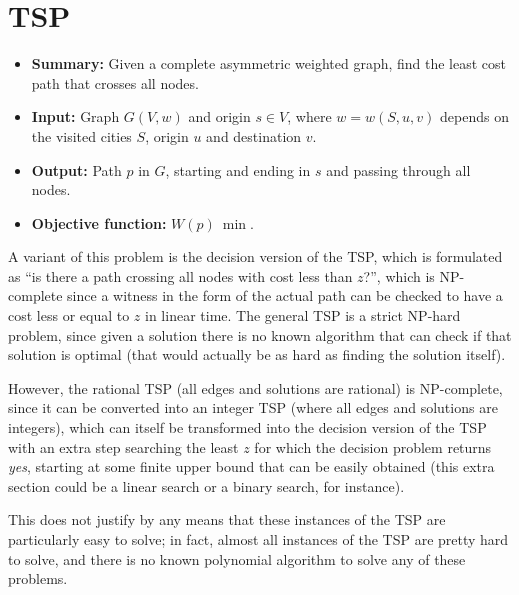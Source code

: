 \section{\texorpdfstring{\Acrlong*{TSP}}{Travelling salesman problem}} \label{algorithm-tsp}
\begin{itemize}
    \item \textbf{Summary:} Given a complete asymmetric weighted graph, find the least cost path that crosses all nodes. 
    \item \textbf{Input:} Graph $G(V,w)$ and origin $s \in V$, where $w=w(S, u, v)$ depends on the visited cities $S$, origin $u$ and destination $v$.
    \item \textbf{Output:} Path $p$ in $G$, starting and ending in $s$ and passing through all nodes.
    \item \textbf{Objective function:} $W(p)~\min$.
\end{itemize}
A variant of this problem is the decision version of the \acrshort*{TSP}, which is formulated as ``is there a path crossing all nodes with cost less than $z$?'', which is NP-complete since a witness in the form of the actual path can be checked to have a cost less or equal to $z$ in linear time.
The general \acrshort*{TSP} is a strict NP-hard problem, since given a solution there is no known algorithm that can check if that solution is optimal (that would actually be as hard as finding the solution itself).\par
However, the rational \acrshort*{TSP} (all edges and solutions are rational) is NP-complete, since it can be converted into an integer \acrshort*{TSP} (where all edges and solutions are integers), which can itself be transformed into the decision version of the \acrshort*{TSP} with an extra step searching the least $z$ for which the decision problem returns \emph{yes}, starting at some finite upper bound that can be easily obtained (this extra section could be a linear search or a binary search, for instance).\par
This does not justify by any means that these instances of the \acrshort*{TSP} are particularly easy to solve; in fact, almost all instances of the \acrshort*{TSP} are pretty hard to solve, and there is no known polynomial algorithm to solve any of these problems.


